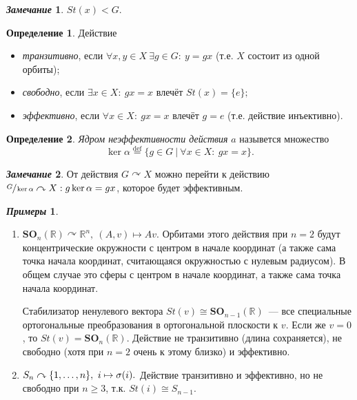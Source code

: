 \documentclass[a4paper, 14pt]{extarticle}
\newcommand{\deq}{\stackrel{\mathrm{def}}{=}}
\newcommand{\n}{\par}
\newcommand{\real}{\mathbb{R}}
\newcommand{\SOrth}{\mathbf{SO}}
\theoremstyle{definition}
\newtheorem*{exmpls}{\textit{Примеры}}
\newtheorem*{remark}{\textit{Замечание}}
\newtheorem{definition}{Определение}
\theoremstyle{plain}
\numberwithin{theorem}{section}
\numberwithin{definition}{section}
\numberwithin{statement}{section}
\numberwithin{lemma}{section}
\numberwithin{consequence}{section}
\begin{document}
        \begin{remark}
            $St(x) < G.$
        \end{remark}
        \begin{definition}
            Действие
            \begin{itemize}
                \item \textit{транзитивно}, если $\forall x,y \in X \ \exists g \in G{:} \ y = gx$ (т.е. $X$ состоит из одной орбиты);
                \item \textit{свободно}, если $\exists x \in X{:} \ gx = x$ влечёт $St(x) = \{e\};$
                \item \textit{эффективно}, если ${\forall x \in X{:} \ gx = x}$ влечёт ${g = e}$ (т.е. действие инъективно).
            \end{itemize}
        \end{definition}
        \begin{definition}
            \textit{Ядром неэффективности действия} $a$ назывется множество 
            \begin{equation*}
                \ker \alpha \deq \{g \in G \ | \ \forall x \in X{:} \ gx = x\}.
            \end{equation*}
        \end{definition}
        \begin{remark}
            От действия ${G \curvearrowright X}$ можно перейти к действию ${\sfrac{G}{\ker \alpha} \curvearrowright X : g \ker \alpha = gx}$, которое будет эффективным.
        \end{remark}
        \begin{exmpls}
            \
            \begin{enumerate}
                \item ${\SOrth_n(\real) \curvearrowright \real^n, \ (A,v) \mapsto Av.}$ Орбитами этого действия при ${n = 2}$ будут концентрические окружности с центром в начале координат (а также сама точка начала координат, считающаяся окружностью с нулевым радиусом). В общем случае это сферы с центром в начале координат, а также сама точка начала координат.\n
                Стабилизатор ненулевого вектора ${St(v) \cong \SOrth_{n - 1}(\real)}$~--- все специальные ортогональные преобразования в ортогональной плоскости к $v$. Если же $v = 0$, то $St(v) = \SOrth_n(\real)$.
                Действие не транзитивно (длина сохраняется), не свободно (хотя при ${n = 2}$ очень к этому близко) и эффективно.
                \item ${S_n \curvearrowright \{1,\mathellipsis, n\}, \ i \mapsto \sigma(i)}.$ Действие транзитивно и эффективно, но не свободно при $n \geqslant 3$, т.к. ${St(i) \cong S_{n-1}.}$ 
            \end{enumerate}
        \end{exmpls}
\end{document}
